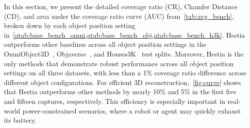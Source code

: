In this section, we present the detailed coverage ratio (CR), Chamfer Distance (CD), and area under the coverage ratio curve (AUC) from~\cref{tab:avg_bench}, broken down by each object position setting in~\cref{atab:base_bench_omni,atab:base_bench_obj,atab:base_bench_h3k}.
Hestia outperforms other baselines across all object position settings in the OmniObject3D~\cite{wu2023omniobject3d}, Objaverse~\cite{Deitke_2023_CVPR}, and Houses3K~\cite{peralta2020next} test splits. 
Moreover, Hestia is the only methods that demonstrate robust performance across all object position settings on all three datasets, with less than a 1\% coverage ratio difference across different object configurations.
For efficient 3D reconstruction,~\cref{fig:curve} shows that Hestia outperforms other methods by nearly 10\% and 5\% in the first five and fifteen captures, respectively. 
This efficiency is especially important in real-world power-constrained scenarios, where a robot or agent may quickly exhaust its battery.
